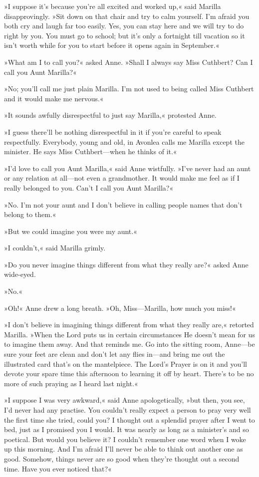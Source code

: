 »I suppose it's because you're all excited and worked up,« said Marilla disapprovingly. »Sit down on that chair and try to calm yourself. I'm afraid you both cry and laugh far too easily. Yes, you can stay here and we will try to do right by you. You must go to school; but it's only a fortnight till vacation so it isn't worth while for you to start before it opens again in September.«

»What am I to call you?« asked Anne. »Shall I always say Miss Cuthbert? Can I call you Aunt Marilla?«

»No; you'll call me just plain Marilla. I'm not used to being called Miss Cuthbert and it would make me nervous.«

»It sounds awfully disrespectful to just say Marilla,« protested Anne.

»I guess there'll be nothing disrespectful in it if you're careful to speak respectfully. Everybody, young and old, in Avonlea calls me Marilla except the minister. He says Miss Cuthbert—when he thinks of it.«

»I'd love to call you Aunt Marilla,« said Anne wistfully. »I've never had an aunt or any relation at all—not even a grandmother. It would make me feel as if I really belonged to you. Can't I call you Aunt Marilla?«

»No. I'm not your aunt and I don't believe in calling people names that don't belong to them.«

»But we could imagine you were my aunt.«

»I couldn't,« said Marilla grimly.

»Do you never imagine things different from what they really are?« asked Anne wide-eyed.

»No.«

»Oh!« Anne drew a long breath. »Oh, Miss—Marilla, how much you miss!«

»I don't believe in imagining things different from what they really are,« retorted Marilla. »When the Lord puts us in certain circumstances He doesn't mean for us to imagine them away. And that reminds me. Go into the sitting room, Anne—be sure your feet are clean and don't let any flies in—and bring me out the illustrated card that's on the mantelpiece. The Lord's Prayer is on it and you'll devote your spare time this afternoon to learning it off by heart. There's to be no more of such praying as I heard last night.«

»I suppose I was very awkward,« said Anne apologetically, »but then, you see, I'd never had any practise. You couldn't really expect a person to pray very well the first time she tried, could you? I thought out a splendid prayer after I went to bed, just as I promised you I would. It was nearly as long as a minister's and so poetical. But would you believe it? I couldn't remember one word when I woke up this morning. And I'm afraid I'll never be able to think out another one as good. Somehow, things never are so good when they're thought out a second time. Have you ever noticed that?«

